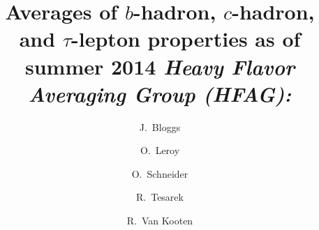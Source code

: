 \documentclass[12pt,twoside]{article}
\begin{document}
\setcounter{page}{1}
\thispagestyle{empty}
\renewcommand\Affilfont{\itshape\small}

\title{
  Averages of $b$-hadron, $c$-hadron, and $\tau$-lepton properties
  as of summer 2014
\vskip0.20in
\large{\it Heavy Flavor Averaging Group (HFAG):}
\vspace*{-0.20in}}
\author[1]{J.~Bloggs}
\author[21]{O.~Leroy}

\author[23]{O.~Schneider}
\author[34]{R.~Tesarek}
\author[35]{R.~Van Kooten}
\end{document}
